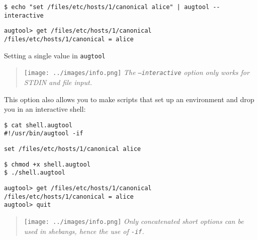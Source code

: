   

\begin{listing}
  \begin{verbatim}
$ echo "set /files/etc/hosts/1/canonical alice" | augtool --interactive
  \end{verbatim}
  \begin{verbatim}
augtool> get /files/etc/hosts/1/canonical
/files/etc/hosts/1/canonical = alice
  \end{verbatim}
  \caption{Setting a single value in \texttt{augtool}}
  \label{lst:augtool_set_single}
\end{listing}

\begin{quote}
\texttt{[image: ../images/info.png]} \emph{The \texttt{--interactive} option only works for STDIN and file input.}

\end{quote}
This option also allows you to make scripts that set up an environment and drop you in an interactive shell:

   

\begin{verbatim}
$ cat shell.augtool
#!/usr/bin/augtool -if
\end{verbatim}
\begin{verbatim}
set /files/etc/hosts/1/canonical alice
\end{verbatim}
\begin{verbatim}
$ chmod +x shell.augtool
$ ./shell.augtool
\end{verbatim}
\begin{verbatim}
augtool> get /files/etc/hosts/1/canonical
/files/etc/hosts/1/canonical = alice
augtool> quit
\end{verbatim}

\begin{quote}
\texttt{[image: ../images/info.png]} \emph{Only concatenated short options can be used in shebangs, hence the use of \texttt{-if}.}
\end{quote}
